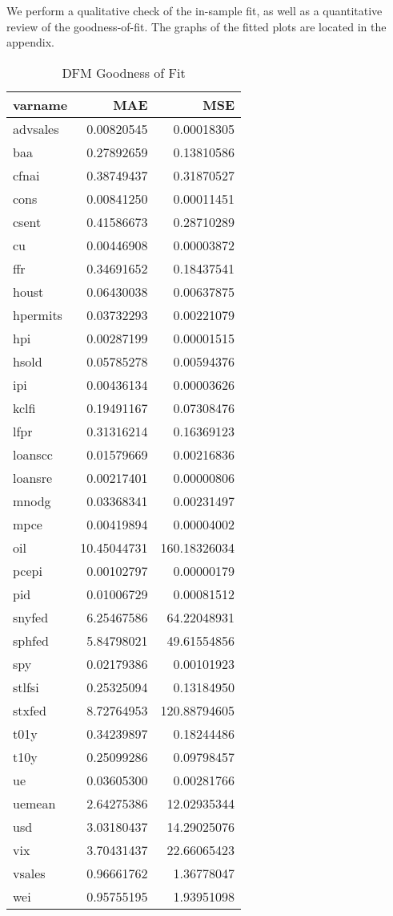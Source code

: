 \documentclass[11pt, letterpaper]{article}\usepackage[]{graphicx}\usepackage[]{color}
\begin{document}
We perform a qualitative check of the in-sample fit, as well as a quantitative review of the goodness-of-fit. The graphs of the fitted plots are located in the appendix.
\begin{table}[H]
\centering
\begingroup\footnotesize
\begin{tabular}{lrr}
  \hline
varname & MAE & MSE \\ 
  \hline
advsales & 0.00820545 & 0.00018305 \\ 
  baa & 0.27892659 & 0.13810586 \\ 
  cfnai & 0.38749437 & 0.31870527 \\ 
  cons & 0.00841250 & 0.00011451 \\ 
  csent & 0.41586673 & 0.28710289 \\ 
  cu & 0.00446908 & 0.00003872 \\ 
  ffr & 0.34691652 & 0.18437541 \\ 
  houst & 0.06430038 & 0.00637875 \\ 
  hpermits & 0.03732293 & 0.00221079 \\ 
  hpi & 0.00287199 & 0.00001515 \\ 
  hsold & 0.05785278 & 0.00594376 \\ 
  ipi & 0.00436134 & 0.00003626 \\ 
  kclfi & 0.19491167 & 0.07308476 \\ 
  lfpr & 0.31316214 & 0.16369123 \\ 
  loanscc & 0.01579669 & 0.00216836 \\ 
  loansre & 0.00217401 & 0.00000806 \\ 
  mnodg & 0.03368341 & 0.00231497 \\ 
  mpce & 0.00419894 & 0.00004002 \\ 
  oil & 10.45044731 & 160.18326034 \\ 
  pcepi & 0.00102797 & 0.00000179 \\ 
  pid & 0.01006729 & 0.00081512 \\ 
  snyfed & 6.25467586 & 64.22048931 \\ 
  sphfed & 5.84798021 & 49.61554856 \\ 
  spy & 0.02179386 & 0.00101923 \\ 
  stlfsi & 0.25325094 & 0.13184950 \\ 
  stxfed & 8.72764953 & 120.88794605 \\ 
  t01y & 0.34239897 & 0.18244486 \\ 
  t10y & 0.25099286 & 0.09798457 \\ 
  ue & 0.03605300 & 0.00281766 \\ 
  uemean & 2.64275386 & 12.02935344 \\ 
  usd & 3.03180437 & 14.29025076 \\ 
  vix & 3.70431437 & 22.66065423 \\ 
  vsales & 0.96661762 & 1.36778047 \\ 
  wei & 0.95755195 & 1.93951098 \\ 
   \hline
\end{tabular}
\endgroup
\caption{DFM Goodness of Fit} 
\end{table}
\end{document}
